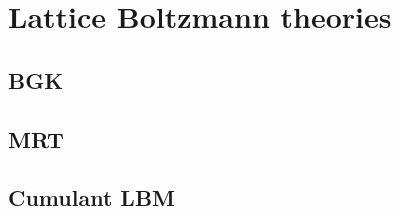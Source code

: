 \newpage

\section{Lattice Boltzmann theories}
\subsection{BGK}
\subsection{MRT}
\subsection{Cumulant LBM}